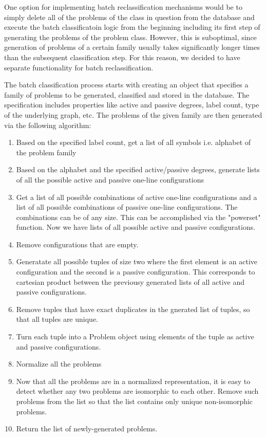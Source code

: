 One option for implementing batch reclassification
mechanisms would be to simply delete all of the problems
of the class in question from the database and execute
the batch classificatoin logic from the beginning
including its first step of generating the problems
of the problem class. However, this is suboptimal,
since generation of problems of a certain family
usually takes significantly longer times than
the subsequent classification step. For this reason,
we decided to have separate functionality for
batch reclassification.

The batch classification process starts with creating
an object that specifies a family of problems to be
generated, classified and stored in the database.
The specification includes properties like
active and passive degrees, label count, type of the
underlying graph, etc. The problems of the given
family are then generated via the following algorithm:

\begin{enumerate}
  \item Based on the specified label count, get a list of
  all symbols i.e. alphabet of the problem family
  \item Based on the alphabet and the specified active/passive
  degrees, generate lists of all the possible
  active and passive one-line configurations
  \item Get a list of all possible combinations
  of active one-line configurations and a list of all possible
  combinations of passive one-line configurations. The combinations
  can be of any size. This can be accomplished via
  the "powerset" function. Now we have lists of
  all possible active and passive configurations.
  \item Remove configurations that are empty.
  \item Generatate all possible tuples of size two
  where the first element is an active configuration and
  the second is a passive configuration. This corresponds
  to cartesian product between the previousy generated
  lists of all active and passive configurations.
  \item Remove tuples that have exact duplicates in the
  gnerated list of tuples, so that all tuples are unique.
  \item Turn each tuple into a Problem object using
  elements of the tuple as active and passive configurations.
  \item Normalize all the problems
  \item Now that all the problems are in a normalized 
  representation, it is easy to detect whether any two
  problems are isomorphic to each other. Remove such
  problems from the list so that the list contains only
  unique non-isomorphic problems.
  \item Return the list of newly-generated problems.
\end{enumerate}

